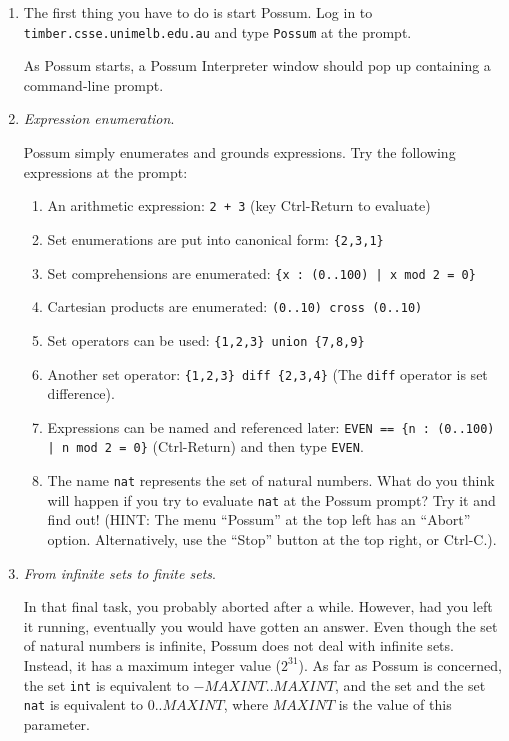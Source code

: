\documentclass{article}
\begin{document}
\begin{enumerate}

 \item The first thing you have to do is start Possum. Log in to \texttt{timber.csse.unimelb.edu.au} and type \texttt{Possum} at the prompt.

 As Possum starts, a Possum Interpreter window should pop up containing a command-line prompt.

 \item \emph{Expression enumeration}.

  Possum simply enumerates and grounds expressions. Try the following  expressions at the prompt:

   \begin{enumerate}
    \item An arithmetic expression: \texttt{2 + 3}  (key Ctrl-Return to evaluate)
    \item Set enumerations are put into canonical form: \texttt{\{2,3,1\}}
    \item Set comprehensions are enumerated: \texttt{\{x : (0..100) | x mod 2 = 0\}}
    \item Cartesian products are enumerated: \texttt{(0..10) cross (0..10)} 
    \item Set operators can be used: \texttt{\{1,2,3\} union \{7,8,9\}}
    \item Another set operator: \texttt{\{1,2,3\} diff \{2,3,4\}}  (The \texttt{diff} operator is set difference).
    \item Expressions can be named and referenced later: \texttt{EVEN == \{n : (0..100) | n mod 2 = 0\}} (Ctrl-Return) and then type \texttt{EVEN}.
    \item  The name \texttt{nat} represents the set of natural numbers. What do you think will happen if you try to evaluate \texttt{nat} at the Possum prompt? Try it and find out! (HINT: The menu ``Possum'' at the top left has an ``Abort'' option. Alternatively, use the ``Stop'' button at the top right, or Ctrl-C.).
   \end{enumerate} 

 \item \emph{From infinite sets to finite sets}.

  In that final task, you probably aborted after a while. However, had you left it running, eventually you would have gotten an answer. Even though the set of natural numbers is infinite, Possum does not deal with infinite sets.  Instead, it has a maximum integer value ($2^{31}$). As far as Possum is concerned, the set \texttt{int}  is equivalent to $-MAXINT .. MAXINT$, and the set  and the set \texttt{nat} is equivalent to $0 .. MAXINT$, where $MAXINT$ is the value of this parameter.


\end{enumerate}
\end{document}
